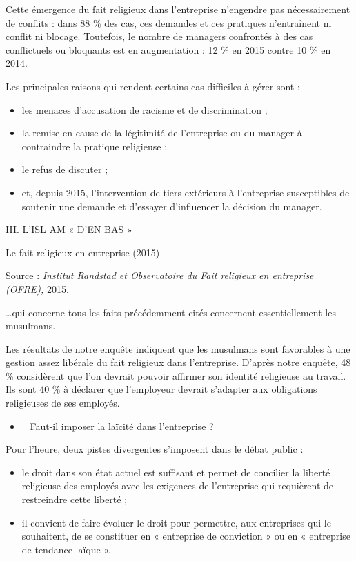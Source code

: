 Cette émergence du fait religieux dans l'entreprise n'engendre pas
nécessairement de conflits : dans 88 \% des cas, ces demandes et ces
pratiques n'entraînent ni conflit ni blocage. Toutefois, le nombre de
managers confrontés à des cas conflictuels ou bloquants est en
augmentation : 12 \% en 2015 contre 10 \% en 2014.

Les principales raisons qui rendent certains cas difficiles à gérer sont
:


\begin{itemize}
\item
  les menaces d'accusation de racisme et de discrimination ;
\item
  la remise en cause de la légitimité de l'entreprise ou du manager à
  contraindre la pratique religieuse ;
\item
  le refus de discuter ;
\item
  et, depuis 2015, l'intervention de tiers extérieurs à l'entreprise
  susceptibles de soutenir une demande et d'essayer d'influencer la
  décision du manager.
\end{itemize}


III. L'ISL AM « D'EN BAS »


Le fait religieux en entreprise (2015)


Source : \emph{Institut Randstad et Observatoire du Fait religieux en
entreprise (OFRE),} 2015.


\ldots qui concerne tous les faits précédemment cités concernent
essentiellement les musulmans.


Les résultats de notre enquête indiquent que les musulmans sont
favorables à une gestion assez libérale du fait religieux dans
l'entreprise. D'après notre enquête, 48 \% considèrent que l'on devrait
pouvoir affirmer son identité religieuse au travail. Ils sont 40 \% à
déclarer que l'employeur devrait s'adapter aux obligations religieuses
de ses employés.


\begin{itemize}
\item ~
  Faut-il imposer la laïcité dans l'entreprise ?
\end{itemize}


Pour l'heure, deux pistes divergentes s'imposent dans le débat public :


\begin{itemize}
\item
  le droit dans son état actuel est suffisant et permet de concilier la
  liberté religieuse des employés avec les exigences de l'entreprise qui
  requièrent de restreindre cette liberté ;
\item
  il convient de faire évoluer le droit pour permettre, aux entreprises
  qui le souhaitent, de se constituer en « entreprise de conviction » ou
  en « entreprise de tendance laïque ».
\end{itemize}


